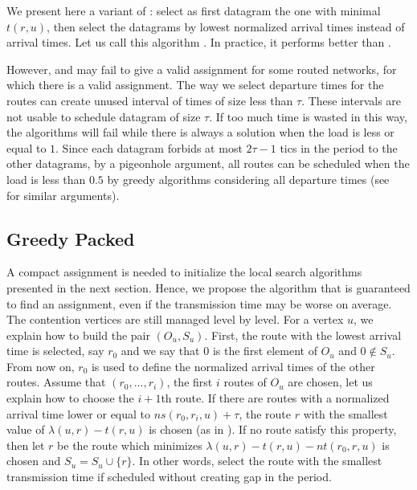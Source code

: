 \documentclass[english]{article}
\begin{document}
We present here a variant of \greedydeadline: select as first datagram the one with minimal $t(r,u)$, then select the datagrams by lowest normalized arrival times instead of arrival times. Let us call this algorithm
\greedynormalized. In practice, it performs better than \greedydeadline.

However, \greedydeadline and \greedynormalized may fail to give a valid assignment for some routed networks, for which there is a valid assignment. The way we select departure times for the routes can create unused interval of times of size less than $\tau$. These intervals are not usable to schedule datagram of size $\tau$. If too much time is wasted in this way, the algorithms will fail while there is always a solution when the load is less or equal to $1$. Since each datagram forbids at most $2\tau -1$ tics in the period to the other datagrams, by a pigeonhole argument, all routes can be scheduled when the load is less than $0.5$ by greedy algorithms considering all departure times (see~\cite{barth2018deterministic,guiraud2020scheduling} for similar arguments).



\subsection{Greedy Packed}


A compact assignment is needed to initialize the local search algorithms presented in the next section. Hence, we propose the \greedypacked algorithm that is guaranteed to find an assignment, even if the transmission time may be worse on average.
The contention vertices are still managed level by level. For a vertex $u$, we explain how to build the pair $(O_u,S_u)$. First, the route with the lowest arrival time is selected, say $r_0$ and we say that $0$ is the first element of $O_u$ and $0 \notin S_u$. From now on, $r_0$ is used to define the normalized arrival times of the other routes. Assume that $(r_0,\dots,r_i)$, the first $i$ routes of $O_u$ are chosen, let us explain how to choose the $i+1$th route. If there are routes with a normalized arrival time lower or equal to $ns(r_0,r_i,u)+\tau$, the route $r$ with the smallest value of $\lambda(u,r) - t(r,u)$ is chosen (as in \greedynormalized). If no route satisfy this property, then let $r$ be the route which minimizes $\lambda(u,r) - t(r,u) - nt(r_0,r,u)$ is chosen and $S_u = S_u \cup \{r\}$. In other words, select the route with the smallest transmission time if scheduled without creating gap in the period.
\end{document}
